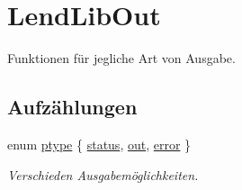 \hypertarget{group___lend_lib_out}{}\section{Lend\+Lib\+Out}
\label{group___lend_lib_out}


Funktionen für jegliche Art von Ausgabe.  


\subsection*{Aufzählungen}
\begin{DoxyCompactItemize}
\item 
enum \hyperlink{group___lend_lib_out_ga0916607956575302a93dbd21440edc1a}{ptype} \{ \hyperlink{group___lend_lib_out_gga0916607956575302a93dbd21440edc1aa9a6940c3bba41cdd6dacae1a00176a30}{status}, 
\hyperlink{group___lend_lib_out_gga0916607956575302a93dbd21440edc1aaaca14bf8f96bb2b357f12496b7f11579}{out}, 
\hyperlink{group___lend_lib_out_gga0916607956575302a93dbd21440edc1aad606e435413ea0944dd00d49e901e4ed}{error}
 \}\begin{DoxyCompactList}\small\item\em Verschieden Ausgabemöglichkeiten. \end{DoxyCompactList}
\end{DoxyCompactItemize}
